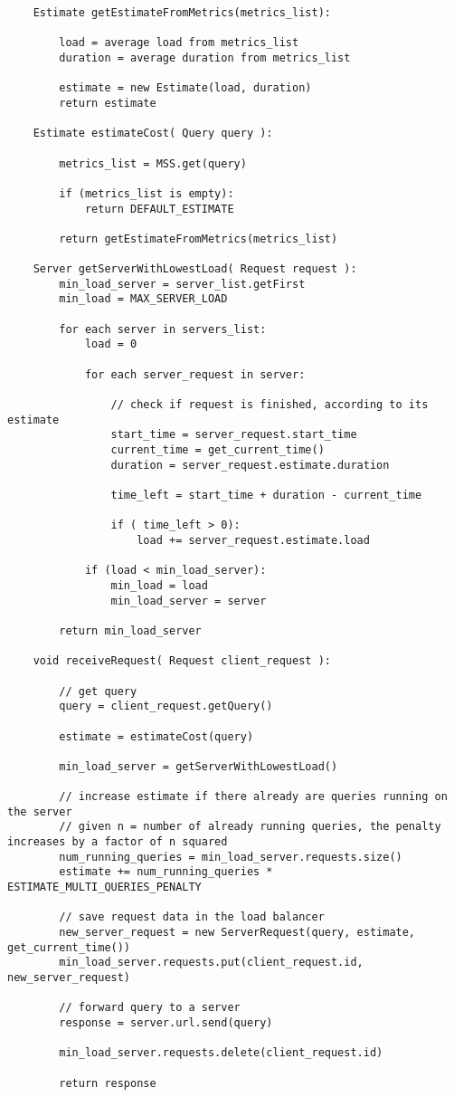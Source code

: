 \documentclass[10pt,twocolumn]{article}
\begin{document}
\begin{verbatim}
    Estimate getEstimateFromMetrics(metrics_list):

        load = average load from metrics_list
        duration = average duration from metrics_list

        estimate = new Estimate(load, duration)
        return estimate

    Estimate estimateCost( Query query ):

        metrics_list = MSS.get(query)

        if (metrics_list is empty):
            return DEFAULT_ESTIMATE

        return getEstimateFromMetrics(metrics_list)

    Server getServerWithLowestLoad( Request request ):
        min_load_server = server_list.getFirst
        min_load = MAX_SERVER_LOAD

        for each server in servers_list:
            load = 0

            for each server_request in server:

                // check if request is finished, according to its estimate
                start_time = server_request.start_time
                current_time = get_current_time()
                duration = server_request.estimate.duration

                time_left = start_time + duration - current_time

                if ( time_left > 0):
                    load += server_request.estimate.load

            if (load < min_load_server):
                min_load = load
                min_load_server = server

        return min_load_server

    void receiveRequest( Request client_request ):

        // get query
        query = client_request.getQuery()

        estimate = estimateCost(query)

        min_load_server = getServerWithLowestLoad()

        // increase estimate if there already are queries running on the server
        // given n = number of already running queries, the penalty increases by a factor of n squared
        num_running_queries = min_load_server.requests.size()
        estimate += num_running_queries * ESTIMATE_MULTI_QUERIES_PENALTY

        // save request data in the load balancer
        new_server_request = new ServerRequest(query, estimate, get_current_time())
        min_load_server.requests.put(client_request.id, new_server_request)

        // forward query to a server
        response = server.url.send(query)

        min_load_server.requests.delete(client_request.id)

        return response
\end{verbatim}
\end{document}
